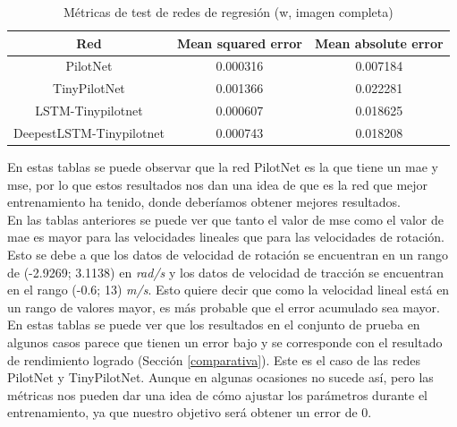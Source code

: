 \begin{table}[H]
\centering
\caption{Métricas de test de redes de regresión (w, imagen completa)}
\label{metricas_reg_completa_w}
\begin{tabular}{c|c|c|}
\cline{1-3}
                        \multicolumn{1}{|c|}{Red}    & Mean squared error       & Mean absolute error             \\ \hline
\multicolumn{1}{|c|}{PilotNet}    & 0.000316   & 0.007184    \\ \hline
\multicolumn{1}{|c|}{TinyPilotNet}     & 0.001366      & 0.022281   \\ \hline
\multicolumn{1}{|c|}{LSTM-Tinypilotnet}     & 0.000607    & 0.018625        \\ \hline
\multicolumn{1}{|c|}{DeepestLSTM-Tinypilotnet}     & 0.000743  & 0.018208        \\ \hline
\end{tabular}
\end{table}


En estas tablas se puede observar que la red PilotNet es la que tiene un \acrshort{mae} y \acrshort{mse}, por lo que estos resultados nos dan una idea de que es la red que mejor entrenamiento ha tenido, donde deberíamos obtener mejores resultados.\\

En las tablas anteriores se puede ver que tanto el valor de \acrshort{mse} como el valor de \acrshort{mae} es mayor para las velocidades lineales que para las velocidades de rotación. Esto se debe a que los datos de velocidad de rotación se encuentran en un rango de (-2.9269; 3.1138) en \textit{rad/s} y los datos de velocidad de tracción se encuentran en el rango (-0.6; 13) \textit{m/s}. Esto quiere decir que como la velocidad lineal está en un rango de valores mayor, es más probable que el error acumulado sea mayor.\\

En estas tablas se puede ver que los resultados en el conjunto de prueba en algunos casos parece que tienen un error bajo y se corresponde con el resultado de rendimiento logrado (Sección \ref{comparativa}). Este es el caso de las redes PilotNet y TinyPilotNet. Aunque en algunas ocasiones no sucede así, pero las métricas nos pueden dar una idea de cómo ajustar los parámetros durante el entrenamiento, ya que nuestro objetivo será obtener un error de 0.\\

